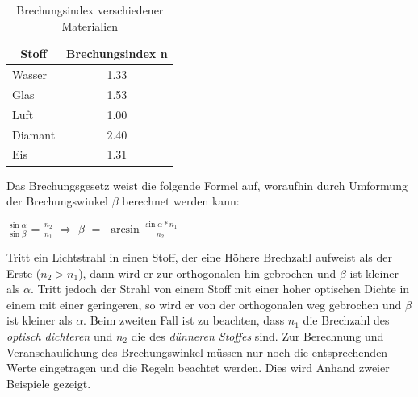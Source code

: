 \begin{table}[H]
\centering
\begin{tabular}{l|c}
\multicolumn{1}{c}{Stoff} & \multicolumn{1}{|c}{Brechungsindex n} \\ \hline \hline
Wasser                    & 1.33                               \\ \hline
Glas                      & 1.53                               \\ \hline
Luft                      & 1.00                               \\ \hline
Diamant                   & 2.40                               \\ \hline
Eis                       & 1.31                               
\end{tabular}
\caption{Brechungsindex verschiedener Materialien}
\label{brechungsindex}
\end{table} 

Das Brechungsgesetz weist die folgende Formel auf, woraufhin durch Umformung der Brechungswinkel $\beta$ berechnet werden kann: 
\begin{center}
$\frac{\sin\alpha}{\sin\beta}$ = $\frac{n_2}{n_1}$ $\Rightarrow$ $\beta$ $=$  $\arcsin\frac{\sin\alpha * n_1}{n_2}$
\end{center}
Tritt ein Lichtstrahl in einen Stoff, der eine Höhere Brechzahl aufweist als der Erste ($n_2 > n_1$), dann wird er zur orthogonalen hin gebrochen und $\beta$ ist kleiner als $\alpha$. Tritt jedoch der Strahl von einem Stoff mit einer hoher optischen Dichte in einem mit einer geringeren, so wird er von der orthogonalen weg gebrochen und $\beta$ ist kleiner als $\alpha$. Beim zweiten Fall ist zu beachten, dass $n_1$ die Brechzahl des \textit{optisch dichteren} und $n_2$ die des \textit{dünneren Stoffes} sind. Zur Berechnung und Veranschaulichung des Brechungswinkel müssen nur noch die entsprechenden Werte eingetragen und die Regeln beachtet werden. Dies wird Anhand zweier Beispiele gezeigt.

